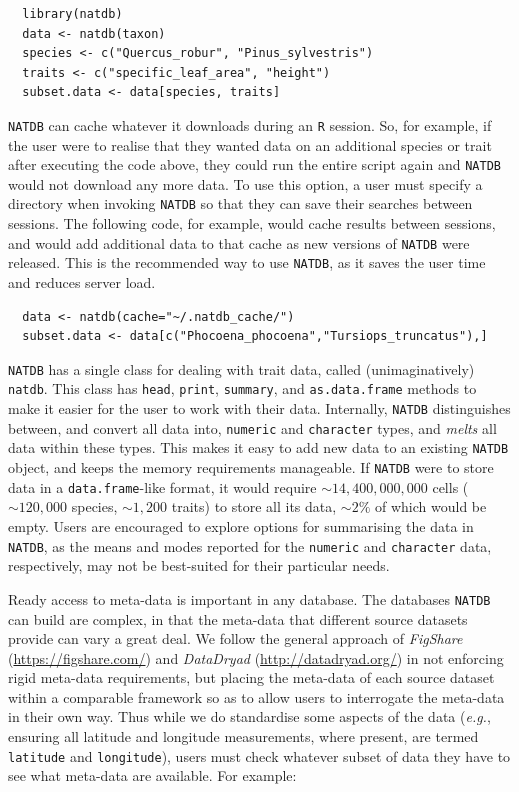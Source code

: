 \documentclass[12pt]{report}
\newcommand{\R}{\texttt{R}\xspace}
\newcommand{\natdb}{\texttt{NATDB}\xspace}
\begin{document}
\begin{verbatim}
  library(natdb)
  data <- natdb(taxon)
  species <- c("Quercus_robur", "Pinus_sylvestris")
  traits <- c("specific_leaf_area", "height")
  subset.data <- data[species, traits]
\end{verbatim}

\natdb can cache whatever it downloads during an \R session. So, for
example, if the user were to realise that they wanted data on an
additional species or trait after executing the code above, they could
run the entire script again and \natdb would not download any more
data. To use this option, a user must specify a directory when
invoking \natdb so that they can save their searches between
sessions. The following code, for example, would cache results between
sessions, and would add additional data to that cache as new versions
of \natdb were released. This is the recommended way to use \natdb, as
it saves the user time and reduces server load.

\begin{verbatim}
  data <- natdb(cache="~/.natdb_cache/")
  subset.data <- data[c("Phocoena_phocoena","Tursiops_truncatus"),]
\end{verbatim}

\natdb has a single class for dealing with trait data, called
(unimaginatively) \texttt{natdb}. This class has \texttt{head},
\texttt{print}, \texttt{summary}, and \texttt{as.data.frame} methods
to make it easier for the user to work with their data. Internally,
\natdb distinguishes between, and convert all data into,
\texttt{numeric} and \texttt{character} types, and \emph{melts}
\autocite[\emph{sensu}][]{Wickham2007} all data within these
types. This makes it easy to add new data to an existing \natdb
object, and keeps the memory requirements manageable. If \natdb were
to store data in a \texttt{data.frame}-like format, it would require
$\mathtt{\sim}14,400,000,000$ cells ($\mathtt{\sim}120,000$ species,
$\mathtt{\sim}1,200$ traits) to store all its data, $\mathtt{\sim}2\%$
of which would be empty. Users are encouraged to explore options for
summarising the data in \natdb, as the means and modes reported for
the \texttt{numeric} and \texttt{character} data, respectively, may
not be best-suited for their particular needs.

Ready access to meta-data is important in any database. The databases
\natdb can build are complex, in that the meta-data that different
source datasets provide can vary a great deal. We follow the general
approach of \emph{FigShare} (\url{https://figshare.com/}) and
\emph{DataDryad} (\url{http://datadryad.org/}) in not enforcing rigid
meta-data requirements, but placing the meta-data of each source
dataset within a comparable framework so as to allow users to
interrogate the meta-data in their own way. Thus while we do
standardise some aspects of the data (\emph{e.g.}, ensuring all
latitude and longitude measurements, where present, are termed
\texttt{latitude} and \texttt{longitude}), users must check whatever
subset of data they have to see what meta-data are available. For
example:
\end{document}

